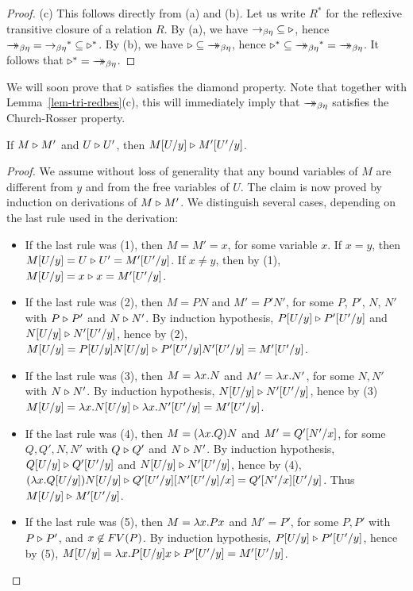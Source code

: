 \documentclass{article}
\begin{document}
\begin{proof}
  (c) This follows directly from (a) and (b). Let us write $R^*$ for
  the reflexive transitive closure of a relation $R$. By (a), we have
  ${\rightarrow_{\beta\eta}}\subseteq{\mathrel{\triangleright}}$, hence ${\mathrel{\rightarrow\!\!\!\!\!\rightarrow}_{\beta\eta}}={\rightarrow_{\beta\eta}}^*\subseteq{\mathrel{\triangleright}}^*$. By
  (b), we have ${\mathrel{\triangleright}}\subseteq{\mathrel{\rightarrow\!\!\!\!\!\rightarrow}_{\beta\eta}}$, hence
  ${\tri}^*\seq{\redbes}^*={\redbes}$. It follows that
  ${\mathrel{\triangleright}}^*={\mathrel{\rightarrow\!\!\!\!\!\rightarrow}_{\beta\eta}}$.\eot
\end{proof}

We will soon prove that $\mathrel{\triangleright}$ satisfies the diamond property.  Note
that together with Lemma~\ref{lem-tri-redbes}(c), this will
immediately imply that $\mathrel{\rightarrow\!\!\!\!\!\rightarrow}_{\beta\eta}$ satisfies the Church-Rosser property.

\begin{lemma}[Substitution]
If $M \mathrel{\triangleright} M'$ and $U \mathrel{\triangleright} U'$, then
$M[U/y] \mathrel{\triangleright} M'[U'/y]$.
\end{lemma}

\begin{proof}
  We assume without loss of generality that any bound variables of $M$
  are different from $y$ and from the free variables of $U$. The claim
  is now proved by induction on derivations of $M\mathrel{\triangleright} M'$. We
  distinguish several cases, depending on the last rule used in the
  derivation:
  \begin{itemize}
  \item If the last rule was (1), then $M=M'=x$, for some variable
    $x$. If $x=y$, then $M[U/y]=U\mathrel{\triangleright} U'=M'[U'/y]$.
    If $x\neq y$, then by (1), $M[U/y]=x\mathrel{\triangleright}
    x=M'[U'/y]$.
  \item If the last rule was (2), then $M=PN$ and $M'=P'N'$, for some
    $P$, $P'$, $N$, $N'$ with $P\mathrel{\triangleright} P'$ and $N\mathrel{\triangleright} N'$. By induction
    hypothesis, $P[U/y]\mathrel{\triangleright} P'[U'/y]$ and
    $N[U/y]\mathrel{\triangleright} N'[U'/y]$, hence by (2),
    $M[U/y]=P[U/y]N[U/y] \mathrel{\triangleright} 
    P'[U'/y]N'[U'/y] = M'[U'/y]$.
  \item If the last rule was (3), then $M=\lambda x.N$ and $M'=\lambda
    x.N'$, for some $N,N'$ with $N\mathrel{\triangleright} N'$. By induction hypothesis,
    $N[U/y]\mathrel{\triangleright} N'[U'/y]$, hence by (3)
    $M[U/y]=\lambda x.N[U/y] \mathrel{\triangleright} \lambda
    x.N'[U'/y] = M'[U'/y]$.
  \item If the last rule was (4), then $M=(\lambda x.Q)N$ and
    $M'=Q'[N'/x]$, for some $Q,Q',N,N'$ with $Q\mathrel{\triangleright} Q'$ and
    $N\mathrel{\triangleright} N'$.  By induction hypothesis, $Q[U/y]\mathrel{\triangleright}
    Q'[U'/y]$ and $N[U/y]\mathrel{\triangleright} N'[U'/y]$,
    hence by (4), $(\lambda x.Q[U/y])N[U/y] \mathrel{\triangleright}
    Q'[U'/y][N'[U'/y]/x] =
    Q'[N'/x][U'/y]$. Thus $M[U/y]
    \mathrel{\triangleright} M'[U'/y]$.
  \item If the last rule was (5), then $M=\lambda x.Px$ and $M'=P'$, for
    some $P,P'$ with $P\mathrel{\triangleright} P'$, and $x\not\in FV(P)$. By induction
    hypothesis, $P[U/y]\mathrel{\triangleright} P'[U'/y]$, hence by (5),
    $M[U/y]=\lambda x.P[U/y]x \mathrel{\triangleright}
    P'[U'/y]=M'[U'/y]$.\eot
  \end{itemize}
\end{proof}
  
\end{document}
